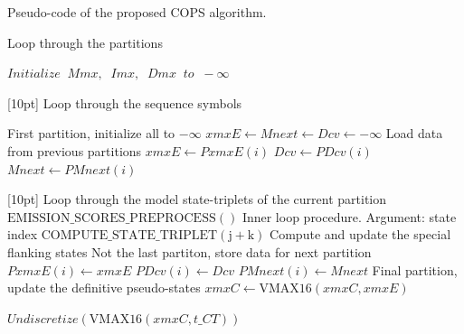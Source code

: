 \documentclass{bmcart}
\begin{document}
\begin{algorithm}[!t]
\caption{Pseudo-code of the proposed COPS algorithm.}
\label{code-complete}

\begin{algorithmic}[1]
\item[]
\LeftComment {} Loop through the partitions

	\State $ Initialize \;\; Mmx,\;\;Imx,\;\;Dmx\;\;to\;\; -\infty $

	\LeftComment \raisebox{-1pt}[10pt]{} Loop through the sequence symbols
		
			\LeftComment First partition, initialize all to $-\infty $
			\State $ xmxE \gets Mnext \gets Dcv \gets -\infty $
		\Else 
			\LeftComment Load data from previous partitions
			\State $xmxE \gets PxmxE(i) $
			\State $Dcv  \gets PDcv(i) $
			\State $Mnext   \gets PMnext(i) $
		\EndIf

		\LeftComment \raisebox{-1pt}[10pt]{} Loop through the model state-triplets of the current partition
			\State	$\mathrm{EMISSION\_SCORES\_PREPROCESS()}$
				\LeftComment Inner loop procedure. Argument: state index
				\State $\mathrm{COMPUTE\_STATE\_TRIPLET(j+k)}$
			\EndFor	
		\EndFor
		\LeftComment Compute and update the special flanking states
			\LeftComment Not the last partiton, store data for next partition
			\State $ PxmxE(i) \gets xmxE $
			\State $ PDcv(i) \gets Dcv $
			\State $ PMnext(i) \gets Mnext $
		\Else 
			\LeftComment Final partition, update the definitive pseudo-states
			\State $ xmxC \gets \mathrm{VMAX16}(xmxC, xmxE) $
		\EndIf
	\EndFor
\EndFor

\State \Return $ Undiscretize(\mathrm{VMAX16}(xmxC,  t\_{CT})) $
\end{algorithmic}
\end{algorithm}
\end{document}
